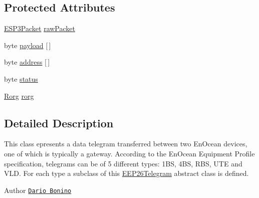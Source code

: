 \subsection*{Protected Attributes}
\begin{DoxyCompactItemize}
\item 
\hyperlink{classit_1_1polito_1_1elite_1_1enocean_1_1protocol_1_1serial_1_1v3_1_1network_1_1packet_1_1_e_s_p3_packet}{E\+S\+P3\+Packet} \hyperlink{classit_1_1polito_1_1elite_1_1enocean_1_1enj_1_1eep_1_1eep26_1_1telegram_1_1_e_e_p26_telegram_a757e920cbb3f88b12a67f947a906ec9d}{raw\+Packet}
\item 
byte \hyperlink{classit_1_1polito_1_1elite_1_1enocean_1_1enj_1_1eep_1_1eep26_1_1telegram_1_1_e_e_p26_telegram_a1f2cc7b289d2d0272aae91f2cb295c00}{payload} \mbox{[}$\,$\mbox{]}
\item 
byte \hyperlink{classit_1_1polito_1_1elite_1_1enocean_1_1enj_1_1eep_1_1eep26_1_1telegram_1_1_e_e_p26_telegram_a283e3949c0619b513cba693802480abe}{address} \mbox{[}$\,$\mbox{]}
\item 
byte \hyperlink{classit_1_1polito_1_1elite_1_1enocean_1_1enj_1_1eep_1_1eep26_1_1telegram_1_1_e_e_p26_telegram_a8a7dccc7059eb130ee6812c2953b9687}{status}
\item 
\hyperlink{classit_1_1polito_1_1elite_1_1enocean_1_1enj_1_1eep_1_1_rorg}{Rorg} \hyperlink{classit_1_1polito_1_1elite_1_1enocean_1_1enj_1_1eep_1_1eep26_1_1telegram_1_1_e_e_p26_telegram_ab4b11180d547ae4d2a28b0912267a734}{rorg}
\end{DoxyCompactItemize}


\subsection{Detailed Description}
This class epresents a data telegram transferred between two En\+Ocean devices, one of which is typically a gateway. According to the En\+Ocean Equipment Profile specification, telegrams can be of 5 different types\+: 1\+BS, 4\+BS, R\+BS, U\+TE and V\+LD. For each type a subclass of this \hyperlink{classit_1_1polito_1_1elite_1_1enocean_1_1enj_1_1eep_1_1eep26_1_1telegram_1_1_e_e_p26_telegram}{E\+E\+P26\+Telegram} abstract class is defined.

\begin{DoxyAuthor}{Author}
\href{mailto:dario.bonino@gmail.com}{\tt Dario Bonino} 
\end{DoxyAuthor}



